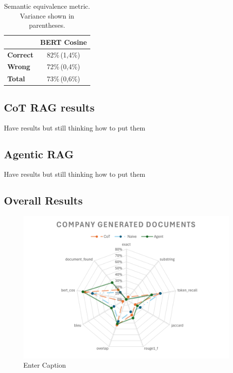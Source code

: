 \begin{table}[h]
\centering
\begin{tabular}{lc}
\hline
 & BERT Cosine \\
\hline
\textbf{Correct} & 82\%\,(1,4\%) \\
\textbf{Wrong}   & 72\%\,(0,4\%) \\
\textbf{Total}   & 73\%\,(0,6\%) \\
\hline
\end{tabular}
\caption{Semantic equivalence metric. Variance shown in parentheses.}
\end{table}

\subsection{CoT RAG results}
Have results but still thinking how to put them
\subsection{Agentic RAG}
Have results but still thinking how to put them

%


\subsection{Overall Results}
\begin{figure}
    \centering
    \includegraphics[width=1\linewidth]{Figures/Company Generated Documents.png}
    \caption{Enter Caption}
    \label{fig:placeholder}
\end{figure}